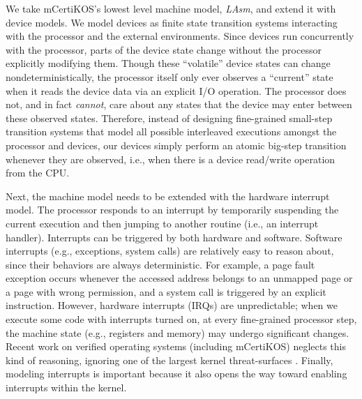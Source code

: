 We take mCertiKOS's lowest level machine model, {\it LAsm}, and extend it with
device models. We model devices as finite state transition systems interacting
with the processor and the external environments. Since devices run concurrently
with the processor, parts of the device state change without the processor
explicitly modifying them. Though these ``volatile'' device states can change
nondeterministically, the processor itself only ever observes a ``current''
state when it reads the device data via an explicit I/O operation. The processor
does not, and in fact {\it cannot}, care about any states that the device may
enter between these observed states. Therefore, instead of designing
fine-grained small-step transition systems that model all possible interleaved
executions amongst the processor and devices, our devices simply perform an
atomic big-step transition whenever they are observed, i.e., when there is a
device read/write operation from the CPU.

Next, the machine model needs to be extended with the hardware interrupt
model. The processor responds to an interrupt by temporarily
suspending the current execution and then jumping to another routine
(i.e., an interrupt handler).  Interrupts can be triggered by both
hardware and software. Software interrupts (e.g., exceptions, system
calls) are relatively easy to reason about, since their behaviors are
always deterministic. For example, a page fault exception occurs
whenever the accessed address belongs to an unmapped page or a page
with wrong permission, and a system call is triggered by an explicit
instruction. However, hardware interrupts (IRQs) are unpredictable;
when we execute some code with interrupts turned on, at every
fine-grained processor step, the machine state (e.g., registers and
memory) may undergo significant changes.  Recent work on verified
operating systems (including mCertiKOS) neglects this kind of
reasoning, ignoring one of the largest kernel threat-surfaces
\cite{dscal15,klein2009sel4,Alkassar:VSTTE2010-71}.  Finally, modeling
interrupts is important because it also opens the way toward enabling
interrupts within the kernel.


